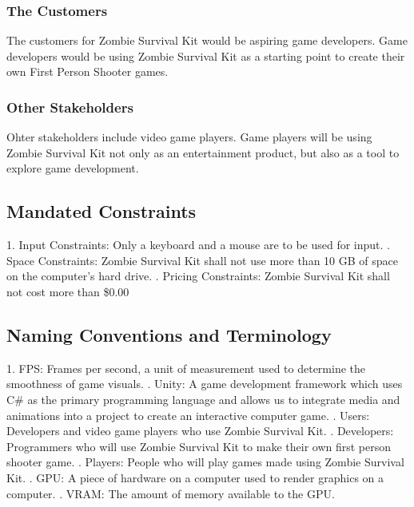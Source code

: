 \documentclass[12pt, titlepage]{article}
\begin{document}
\subsubsection{The Customers}
The customers for Zombie Survival Kit would be aspiring game developers.
\newline
Game developers would be using Zombie Survival Kit as a starting point to create their own First Person Shooter games.
\subsubsection{Other Stakeholders}
Ohter stakeholders include video game players. Game players will be using Zombie Survival Kit not only as an entertainment product, but also as a tool to explore game development.
\subsection{Mandated Constraints}
1. Input Constraints: Only a keyboard and a mouse are to be used for input.
\newline
{}. Space Constraints: Zombie Survival Kit shall not use more than 10 GB of space on the computer’s hard drive.
\newline
{}. Pricing Constraints: Zombie Survival Kit shall not cost more than \$0.00

\subsection{Naming Conventions and Terminology}
1. FPS: Frames per second, a unit of measurement used to determine the smoothness of game visuals.
. Unity: A game development framework which uses C\# as the primary programming language and allows us to integrate media and animations into a project to create an interactive computer game. 
. Users: Developers and video game players who use Zombie Survival Kit. 
. Developers: Programmers who will use Zombie Survival Kit to make their own first person shooter game. 
. Players: People who will play games made using Zombie Survival Kit. 
. GPU: A piece of hardware on a computer used to render graphics on a computer. 
. VRAM: The amount of memory available to the GPU. 
\end{document}
